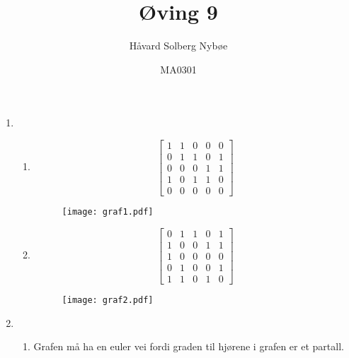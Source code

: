 \documentclass[a4paper, 12pt]{article}  %
\title{Øving 9}                         %
\author{Håvard Solberg Nybøe}           %
\date{MA0301}                           %
\begin{document}
\maketitle

\begin{enumerate}
    \item [\boxed{1}]
    \begin{enumerate}
        \item 
        \begin{equation*}
            \left[
                \begin{array}{ccccc}
                    1 & 1 & 0 & 0 & 0 \\
                    0 & 1 & 1 & 0 & 1 \\
                    0 & 0 & 0 & 1 & 1 \\
                    1 & 0 & 1 & 1 & 0 \\
                    0 & 0 & 0 & 0 & 0
                \end{array}
            \right]
        \end{equation*}
        \begin{figure}[h!]
            \centering
            \texttt{[image: graf1.pdf]}
        \end{figure}
        \newpage
        \item 
        \begin{equation*}
            \left[
                \begin{array}{ccccc}
                    0 & 1 & 1 & 0 & 1 \\
                    1 & 0 & 0 & 1 & 1 \\
                    1 & 0 & 0 & 0 & 0 \\
                    0 & 1 & 0 & 0 & 1 \\
                    1 & 1 & 0 & 1 & 0
                \end{array}
            \right]
        \end{equation*}
        \begin{figure}[h!]
            \centering
            \texttt{[image: graf2.pdf]}
        \end{figure}
    \end{enumerate}
    \item [\boxed{2}]
    \begin{enumerate}
        \item Grafen må ha en euler vei fordi graden til hjørene i grafen er et partall. 

\end{enumerate}
\end{enumerate}
\end{document}
